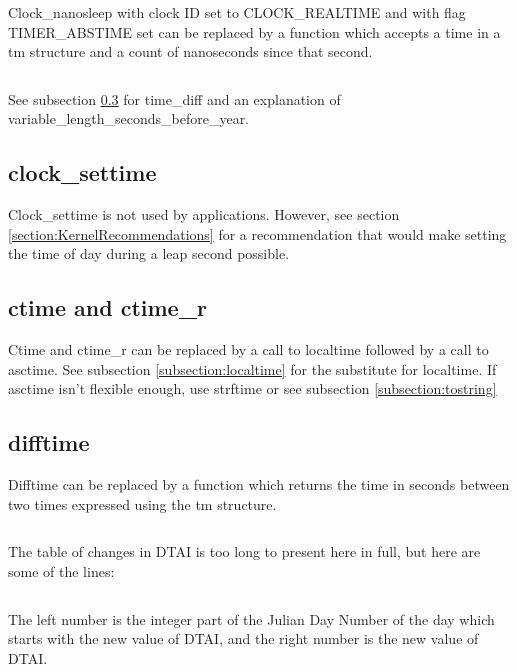 \documentclass[letterpaper,twoside]{article}
\begin{document}
Clock\_nanosleep with clock ID set to CLOCK\_REAL\-TIME and with flag
TIMER\_ABS\-TIME set can be replaced by a function which accepts
a time in a {\ttfamily tm} structure and a count of nanoseconds
since that second.
\inputminted[firstline=32]{c}{src/time_sleep_until.c}
See subsection \ref{subsection:difftime} for time\_diff
and an explanation of variable\_length\_sec\-onds\_before\_year.

\subsection{clock\_settime}
Clock\_settime is not used by applications.
However, see section \ref{section:KernelRecommendations} for a
recommendation that would make setting the time of day during a
leap second possible.

\subsection{ctime and ctime\_r}
Ctime and ctime\_r can be replaced by a call to localtime followed by
a call to asctime.  See subsection \ref{subsection:localtime}
for the substitute for localtime.
If asctime isn't flexible enough, use strftime or see subsection
\ref{subsection:tostring}

\subsection{difftime}
\label{subsection:difftime}
Difftime can be replaced by a function which returns the time in seconds
between two times expressed using the {\ttfamily tm} structure.
\inputminted[firstline=37]{c}{src/time_diff.c}
The table of changes in DTAI is too long to present here in full,
but here are some of the lines:
\inputminted[firstline=46875,lastline=46913]{c}{dtai_table.tab}
The left number is the integer part of the Julian Day Number of the day
which starts with the new value of DTAI, and the right number is the new
value of DTAI.
\end{document}
